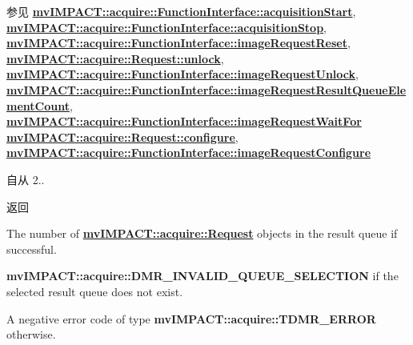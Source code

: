 \begin{DoxySeeAlso}{参见}
{\bfseries \hyperlink{classmv_i_m_p_a_c_t_1_1acquire_1_1_function_interface_a91750ec88416ca6557b1bbb10ebc5039}{mv\+I\+M\+P\+A\+C\+T\+::acquire\+::\+Function\+Interface\+::acquisition\+Start}}, ~\newline
 {\bfseries \hyperlink{classmv_i_m_p_a_c_t_1_1acquire_1_1_function_interface_ab52b63727aa33cb4cc2bdd0856c0f237}{mv\+I\+M\+P\+A\+C\+T\+::acquire\+::\+Function\+Interface\+::acquisition\+Stop}}, ~\newline
 {\bfseries \hyperlink{classmv_i_m_p_a_c_t_1_1acquire_1_1_function_interface_a234b2c6e31f3e83629501da47095c54f}{mv\+I\+M\+P\+A\+C\+T\+::acquire\+::\+Function\+Interface\+::image\+Request\+Reset}}, ~\newline
 {\bfseries \hyperlink{classmv_i_m_p_a_c_t_1_1acquire_1_1_request_a3c30ced407d20caef49e3148257cd91e}{mv\+I\+M\+P\+A\+C\+T\+::acquire\+::\+Request\+::unlock}}, ~\newline
 {\bfseries \hyperlink{classmv_i_m_p_a_c_t_1_1acquire_1_1_function_interface_a378a338217d5a681e880a0d9395f1a62}{mv\+I\+M\+P\+A\+C\+T\+::acquire\+::\+Function\+Interface\+::image\+Request\+Unlock}}, ~\newline
 {\bfseries \hyperlink{classmv_i_m_p_a_c_t_1_1acquire_1_1_function_interface_a7e608625f2db03327c3fe9964967d0bc}{mv\+I\+M\+P\+A\+C\+T\+::acquire\+::\+Function\+Interface\+::image\+Request\+Result\+Queue\+Element\+Count}}, ~\newline
 {\bfseries \hyperlink{classmv_i_m_p_a_c_t_1_1acquire_1_1_function_interface_a4cefdfda8e8940736ae9a4c97b6de8c9}{mv\+I\+M\+P\+A\+C\+T\+::acquire\+::\+Function\+Interface\+::image\+Request\+Wait\+For}} ~\newline
 {\bfseries \hyperlink{classmv_i_m_p_a_c_t_1_1acquire_1_1_request_a5ad02aed16acd60699f3d8757c63af43}{mv\+I\+M\+P\+A\+C\+T\+::acquire\+::\+Request\+::configure}}, ~\newline
 {\bfseries \hyperlink{classmv_i_m_p_a_c_t_1_1acquire_1_1_function_interface_a05594ac5b54679152d27ac0e73b3908e}{mv\+I\+M\+P\+A\+C\+T\+::acquire\+::\+Function\+Interface\+::image\+Request\+Configure}} 
\end{DoxySeeAlso}
\begin{DoxySince}{自从}
2..
\end{DoxySince}
\begin{DoxyReturn}{返回}

\begin{DoxyItemize}
\item The number of {\bfseries \hyperlink{classmv_i_m_p_a_c_t_1_1acquire_1_1_request}{mv\+I\+M\+P\+A\+C\+T\+::acquire\+::\+Request}} objects in the result queue if successful.
\item {\bfseries mv\+I\+M\+P\+A\+C\+T\+::acquire\+::\+D\+M\+R\+\_\+\+I\+N\+V\+A\+L\+I\+D\+\_\+\+Q\+U\+E\+U\+E\+\_\+\+S\+E\+L\+E\+C\+T\+I\+O\+N} if the selected result queue does not exist.
\item A negative error code of type {\bfseries mv\+I\+M\+P\+A\+C\+T\+::acquire\+::\+T\+D\+M\+R\+\_\+\+E\+R\+R\+O\+R} otherwise. 
\end{DoxyItemize}
\end{DoxyReturn}

